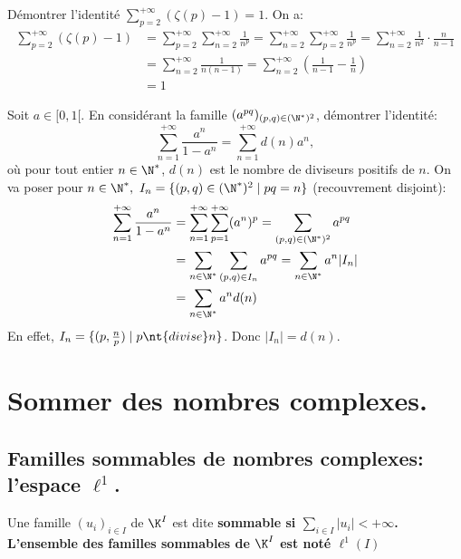\documentclass[11pt]{article}
\begin{document}
\begin{ex}{}{}
    Démontrer l'identité \Large$\sum\limits_{p=2}^{+\infty}(\zeta(p)-1)=1$.
    \tcblower
    On a:
    \begin{align*}
        \sum_{p=2}^{+\infty}(\zeta(p)-1) &= \sum_{p=2}^{+\infty}\sum_{n=2}^{+\infty}\frac{1}{n^p}=\sum_{n=2}^{+\infty}\sum_{p=2}^{+\infty}\frac{1}{n^p}=\sum_{n=2}^{+\infty}\frac{1}{n^2}\cdot\frac{n}{n-1}\\
        &=\sum_{n=2}^{+\infty}\frac{1}{n(n-1)}=\sum_{n=2}^{+\infty}\left(\frac{1}{n-1}-\frac{1}{n}\right)\\
        &=1
    \end{align*}
\end{ex}

\begin{ex}{}{}
    Soit $a\in[0,1[$. En considérant la famille $(a^{pq})_{(p,q)\in(\N^*)^2}$, démontrer l'identité:
    \begin{equation*}
        \sum_{n=1}^{+\infty}\frac{a^n}{1-a^n}=\sum_{n=1}^{+\infty}d(n)a^n,
    \end{equation*}
    où pour tout entier $n\in\N^*$, $d(n)$ est le nombre de diviseurs positifs de $n$.
    \tcblower
    On va poser pour $n\in\N^*, ~ I_n=\{(p,q)\in(\N^*)^2\mid pq=n\}$ (recouvrement disjoint):
    \begin{align*}
        \sum_{n=1}^{+\infty}\frac{a^n}{1-a^n}&=\sum_{n=1}^{+\infty}\sum_{p=1}^{+\infty}(a^n)^p=\sum_{(p,q)\in(\N^*)^2}a^{pq}\\
        &=\sum_{n\in\N^*}\sum_{(p,q)\in I_n}a^{pq}=\sum_{n\in\N^*}a^n|I_n|\\
        &=\sum_{n\in\N^*}a^{n}d(n)
    \end{align*}
    En effet, $I_n=\{(p,\frac{n}{p})\mid p \nt{ divise } n\}$. Donc $|I_n|=d(n)$.
\end{ex}

\section{Sommer des nombres complexes.}

\subsection{Familles sommables de nombres complexes: l'espace \texorpdfstring{$\ell^1$}{Lg}.}

\begin{defi}{}{}
    Une famille $(u_i)_{i\in I}$ de $\K^I$ est dite \bf{sommable} si $\sum\limits_{i\in I}|u_i|<+\infty$.\\
    L'ensemble des familles sommables de $\K^I$ est noté $\ell^1(I)$
\end{defi}
\end{document}
